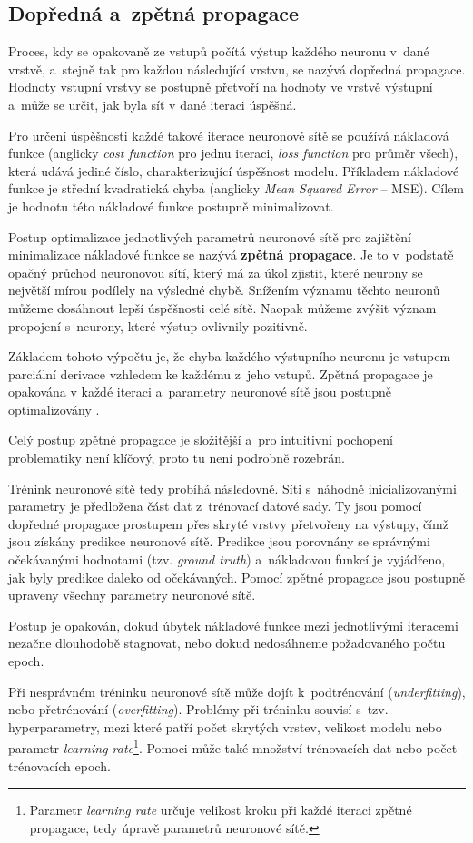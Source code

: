 \subsection{Dopředná a~zpětná propagace}
Proces, kdy se opakovaně ze vstupů počítá výstup každého neuronu v~dané vrstvě, a~stejně tak pro každou následující vrstvu, se nazývá dopředná propagace. Hodnoty vstupní vrstvy se postupně přetvoří na hodnoty ve vrstvě výstupní a~může se určit, jak byla síť v dané iteraci úspěšná.\par
Pro určení úspěšnosti každé takové iterace neuronové sítě se používá nákladová funkce (anglicky \textit{cost function} pro jednu iteraci, \textit{loss function} pro průměr všech), která udává jediné číslo, charakterizující úspěšnost modelu. Příkladem nákladové funkce je střední kvadratická chyba (anglicky \textit{Mean Squared Error} -- MSE). Cílem je hodnotu této nákladové funkce postupně minimalizovat.\par \medskip
Postup optimalizace jednotlivých parametrů neuronové sítě pro zajištění minimalizace nákladové funkce se nazývá \textbf{zpětná propagace}. Je to v~podstatě opačný průchod neuronovou sítí, který má za úkol zjistit, které neurony se největší mírou podílely na výsledné chybě. Snížením významu těchto neuronů můžeme dosáhnout lepší úspěšnosti celé sítě. Naopak můžeme zvýšit význam propojení s~neurony, které výstup ovlivnily pozitivně.\par
Základem tohoto výpočtu je, že chyba každého výstupního neuronu je vstupem parciální derivace vzhledem ke každému z~jeho vstupů. Zpětná propagace je opakována v každé iteraci a~parametry neuronové sítě jsou postupně optimalizovány \cite{neural_nets}.\par
Celý postup zpětné propagace je složitější a~pro intuitivní pochopení problematiky není klíčový, proto tu není podrobně rozebrán.\par
\medskip
Trénink neuronové sítě tedy probíhá následovně. Síti s~náhodně inicializovanými parametry je předložena část dat z~trénovací datové sady. Ty jsou pomocí dopředné propagace prostupem přes skryté vrstvy přetvořeny na výstupy, čímž jsou získány predikce neuronové sítě. Predikce jsou porovnány se správnými očekávanými hodnotami (tzv. \emph{ground truth}) a~nákladovou funkcí je vyjádřeno, jak byly predikce daleko od očekávaných. Pomocí zpětné propagace jsou postupně upraveny všechny parametry neuronové sítě.\par
Postup je opakován, dokud úbytek nákladové funkce mezi jednotlivými iteracemi nezačne dlouhodobě stagnovat, nebo dokud nedosáhneme požadovaného počtu epoch.\par
Při nesprávném tréninku neuronové sítě může dojít k~podtrénování (\textit{underfitting}), nebo přetrénování (\textit{overfitting}). Problémy při tréninku souvisí s~tzv. hyperparametry, mezi které patří počet skrytých vrstev, velikost modelu nebo parametr \emph{learning rate}\footnote{Parametr \emph{learning rate} určuje velikost kroku při každé iteraci zpětné propagace, tedy úpravě parametrů neuronové sítě.}. Pomoci může také množství trénovacích dat nebo počet trénovacích epoch.

